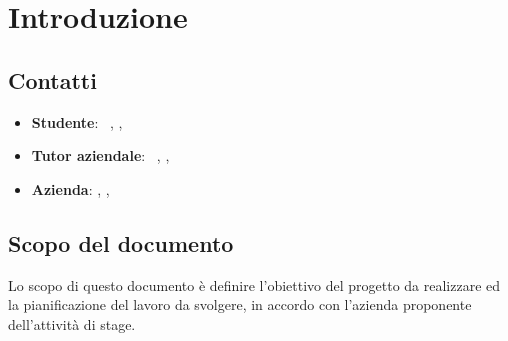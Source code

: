 \section{Introduzione}
\subsection{Contatti}
\begin{itemize}
	\item \textbf{Studente}: \nomeStudente\ \cognomeStudente, \href{mailto:\emailStudente}{\emailStudente}, \telStudente \\
	\item \textbf{Tutor aziendale}: \nomeTutorAziendale\ \cognomeTutorAziendale, \href{mailto:\emailTutorAziendale}{\emailTutorAziendale}, \telTutorAziendale \\
	\item \textbf{Azienda}: \ragioneSocAzienda, \indirizzoAzienda, \href{\sitoAzienda}{\sitoAzienda}
		
\end{itemize}
\subsection{Scopo del documento}
Lo scopo di questo documento è definire l'obiettivo del progetto da realizzare ed la pianificazione del lavoro da svolgere, in accordo con l'azienda proponente dell'attività di stage. 